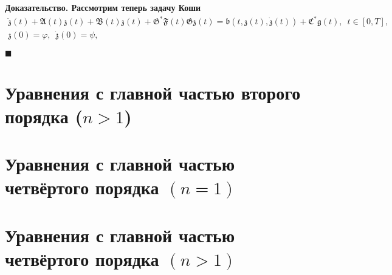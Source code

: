\documentclass{report}
\newenvironment{Proof}{\par\noindent\bf Доказательство.\rm}{ $\blacksquare$\par}
\begin{document}
\begin{Proof}
Рассмотрим теперь задачу Коши
\begin{gather}\label{abstrChauchyprobeq:nonaut:nonlinear!from.Dirichlet[n=1]}
\ddot{\mathfrak{z}}(t)+\mathfrak{A}(t){\mathfrak{z}}(t)+\mathfrak{B}(t){\mathfrak{z}}(t) + \mathfrak{G}^*\mathfrak{F}(t)\mathfrak{G}{\mathfrak{z}}(t) = \mathfrak{b}(t,\mathfrak{z}(t),\dot{\mathfrak{z}}(t)) + \mathfrak{C}^*\mathfrak{g}(t),\,\,\,t\in[0,T],\\
\label{abstrChauchyprobinitcond:nonaut:nonlinear!from.Dirichlet[n=1]}
{\mathfrak{z}}(0)=\varphi,\,\,\,\dot{\mathfrak{z}}(0)=\psi,
\end{gather}

\end{Proof}



    \chapter{Уравнения с главной частью второго порядка ($n>1$)}

    \chapter{Уравнения с главной частью четвёртого порядка $(n=1)$}

    \chapter{Уравнения с главной частью четвёртого порядка $(n>1)$}
\end{document}
